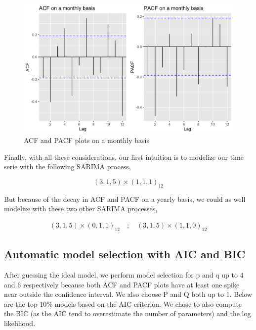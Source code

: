 \begin{figure}[H]
	\centering
	\includegraphics{figures/box_jenkins/monthly_acf_pacf.png}
	\caption{ACF and PACF plots on a monthly basis}
	\label{fig:monthly-acf-pacf}
\end{figure}

Finally, with all these considerations, our first intuition is to modelize our time serie with the following SARIMA process,

\begin{equation}
	(3, 1, 5) \times (1, 1, 1)_{12}
\end{equation}

But because of the decay in ACF and PACF on a yearly basis, we could as well modelize with these two other SARIMA processes,

\begin{equation}
	\begin{array}{rl}
		(3, 1, 5) \times (0, 1, 1)_{12} \quad ; \quad (3, 1, 5) \times (1, 1, 0)_{12}
	\end{array}
\end{equation}

\subsection{Automatic model selection with AIC and BIC}

After guessing the ideal model, we perform model selection for p and q up to $4$ and $6$ respectively because both ACF and PACF plots have at least one spike near outside the confidence interval. We also choose P and Q both up to $1$. Below are the top $10\%$ models based on the AIC criterion. We chose to also compute the BIC (as the AIC tend to overestimate the number of parameters) and the log likelihood.

